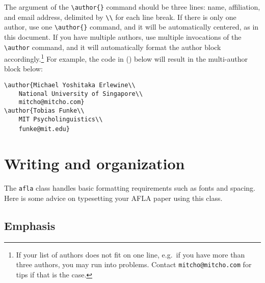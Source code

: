 \documentclass{afla}
\begin{document}
The argument of the \verb`\author{}` command should be three lines: name, affiliation, and email address, delimited by \verb`\\` for each line break. If there is only one author, use one \verb`\author{}` command, and it will be automatically centered, as in this document. If you have multiple authors, use multiple invocations of the \verb`\author` command, and it will automatically format the author block accordingly.\footnote{If your list of authors does not fit on one line, e.g.~if you have more than three authors, you may run into problems. Contact \texttt{mitcho@mitcho.com} for tips if that is the case.} For example, the code in (\nextx) below will result in the multi-author block below:

\ex \verb`\author{Michael Yoshitaka Erlewine\\`\\
	\verb`    National University of Singapore\\`\\
	\verb`    mitcho@mitcho.com}`\\
	\verb`\author{Tobias Funke\\`\\
	\verb`    MIT Psycholinguistics\\`\\
	\verb`    funke@mit.edu}`
\xe
\

\makeatletter
\gdef\@authors\empty
\author{Michael Yoshitaka Erlewine\\
	National University of Singapore\\
	mitcho@mitcho.com}
\author{Tobias Funke\\
	MIT Psycholinguistics\\
	funke@mit.edu}
{\@bspreauthor \@author \@bspostauthor}
\makeatother

\section{Writing and organization}

The \verb`afla` class handles basic formatting requirements such as fonts and spacing. Here is some advice on typesetting your AFLA paper using this class.

\subsection{Emphasis}
\end{document}
